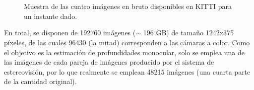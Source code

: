 \begin{figure}[H]
\centering
\hfil
	\\[-2ex]

\hfil
	\\[-2ex]
	
\caption{Muestra de las cuatro imágenes en bruto disponibles en KITTI para un instante dado.}
\label{fig:kitti-raw}
\end{figure}

En total, se disponen de 192760 imágenes ($\sim$ 196 GB) de tamaño 1242x375 píxeles, de las cuales 96430 (la mitad) corresponden a las cámaras a color. Como el objetivo es la estimación de profundidades monocular, solo se emplea una de las imágenes de cada pareja de imágenes producido por el sistema de estereovisión, por lo que realmente se emplean 48215 imágenes (una cuarta parte de la cantidad original).

